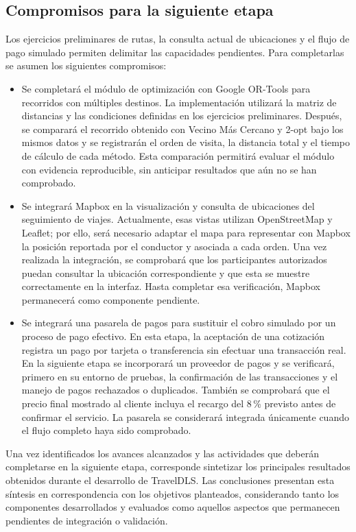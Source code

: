 \subsection{Compromisos para la siguiente etapa}
\label{sec:compromisos-siguiente-etapa}

Los ejercicios preliminares de rutas, la consulta actual de ubicaciones y el flujo de pago simulado permiten delimitar las capacidades pendientes. Para completarlas se asumen los siguientes compromisos:

\begin{itemize}
	\item Se completará el módulo de optimización con Google OR-Tools para recorridos con múltiples destinos. La implementación utilizará la matriz de distancias y las condiciones definidas en los ejercicios preliminares. Después, se comparará el recorrido obtenido con Vecino Más Cercano y 2-opt bajo los mismos datos y se registrarán el orden de visita, la distancia total y el tiempo de cálculo de cada método. Esta comparación permitirá evaluar el módulo con evidencia reproducible, sin anticipar resultados que aún no se han comprobado.
	\item Se integrará Mapbox en la visualización y consulta de ubicaciones del seguimiento de viajes. Actualmente, esas vistas utilizan OpenStreetMap y Leaflet; por ello, será necesario adaptar el mapa para representar con Mapbox la posición reportada por el conductor y asociada a cada orden. Una vez realizada la integración, se comprobará que los participantes autorizados puedan consultar la ubicación correspondiente y que esta se muestre correctamente en la interfaz. Hasta completar esa verificación, Mapbox permanecerá como componente pendiente.
	\item Se integrará una pasarela de pagos para sustituir el cobro simulado por un proceso de pago efectivo. En esta etapa, la aceptación de una cotización registra un pago por tarjeta o transferencia sin efectuar una transacción real. En la siguiente etapa se incorporará un proveedor de pagos y se verificará, primero en su entorno de pruebas, la confirmación de las transacciones y el manejo de pagos rechazados o duplicados. También se comprobará que el precio final mostrado al cliente incluya el recargo del 8\,\% previsto antes de confirmar el servicio. La pasarela se considerará integrada únicamente cuando el flujo completo haya sido comprobado.
\end{itemize}

Una vez identificados los avances alcanzados y las actividades que deberán completarse en la siguiente etapa, corresponde sintetizar los principales resultados obtenidos durante el desarrollo de TravelDLS. Las conclusiones presentan esta síntesis en correspondencia con los objetivos planteados, considerando tanto los componentes desarrollados y evaluados como aquellos aspectos que permanecen pendientes de integración o validación.
